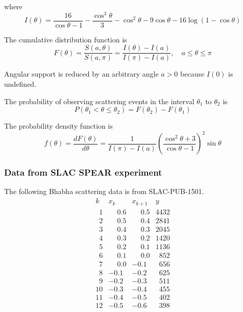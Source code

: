 where
\begin{equation*}
I(\theta)=\frac{16}{\cos\theta-1}-\frac{\cos^3\theta}{3}-\cos^2\theta-9\cos\theta-16\log(1-\cos\theta)
\end{equation*}

The cumulative distribution function is
\begin{equation*}
F(\theta)
=\frac{S(a,\theta)}{S(a,\pi)}
=\frac{I(\theta)-I(a)}{I(\pi)-I(a)},
\quad
a\le\theta\le\pi
\end{equation*}

Angular support is reduced by an arbitrary angle $a>0$ because $I(0)$ is undefined.

\bigskip
The probability of observing scattering events in the interval $\theta_1$ to $\theta_2$ is
\begin{equation*}
P(\theta_1<\theta\le\theta_2)=F(\theta_2)-F(\theta_1)
\end{equation*}

The probability density function is
\begin{equation*}
f(\theta)=\frac{dF(\theta)}{d\theta}
=\frac{1}{I(\pi)-I(a)}
\left(\frac{\cos^2\theta+3}{\cos\theta-1}\right)^2
\sin\theta
\end{equation*}

\subsubsection*{Data from SLAC SPEAR experiment}

The following Bhabha scattering data is from SLAC-PUB-1501.
\begin{equation*}
\begin{matrix}
k & x_k & x_{k+1} & y\\
\phantom01 & \phantom+0.6 & \phantom+0.5 & 4432\\
\phantom02 & \phantom+0.5 & \phantom+0.4 & 2841\\
\phantom03 & \phantom+0.4 & \phantom+0.3 & 2045\\
\phantom04 & \phantom+0.3 & \phantom+0.2 & 1420\\
\phantom05 & \phantom+0.2 & \phantom+0.1 & 1136\\
\phantom06 & \phantom+0.1 & \phantom+0.0 & \phantom{0}852\\
\phantom07 & \phantom+0.0 & -0.1 & \phantom{0}656\\
\phantom08 & -0.1 & -0.2 & \phantom{0}625\\
\phantom09 & -0.2 & -0.3 & \phantom{0}511\\
10 & -0.3 & -0.4 & \phantom{0}455\\
11 & -0.4 & -0.5 & \phantom{0}402\\
12 & -0.5 & -0.6 & \phantom{0}398\\
\end{matrix}
\end{equation*}

